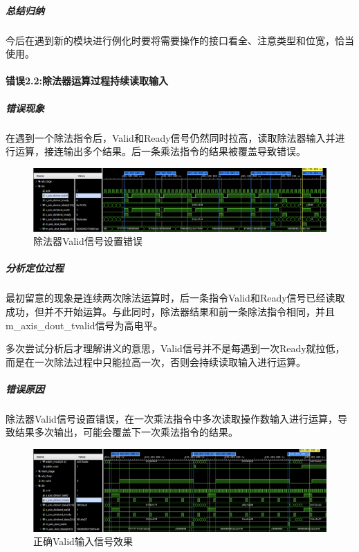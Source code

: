 \documentclass[UTF-8,twoside,c5size]{ctexart}
\begin{document}
	\subparagraph{总结归纳}\hfill
	
	今后在遇到新的模块进行例化时要将需要操作的接口看全、注意类型和位宽，恰当使用。
	
	\paragraph{错误\textbf{2.2:}除法器运算过程持续读取输入}\hfill
	
	\subparagraph{错误现象}\hfill
	
	在遇到一个除法指令后，Valid和Ready信号仍然同时拉高，读取除法器输入并进行运算，接连输出多个结果。后一条乘法指令的结果被覆盖导致错误。
	
	\begin{figure}[h]
		\centering
		\includegraphics[width=1\linewidth]{valid_error.png}
		\caption[valid\_errpr]{除法器Valid信号设置错误}
		\label{fig:validerror}
	\end{figure}
	
	
	\subparagraph{分析定位过程}\hfill
	
	最初留意的现象是连续两次除法运算时，后一条指令Valid和Ready信号已经读取成功，但并不开始运算。与此同时，除法器结果和前一条除法指令相同，并且m\_axis\_dout\_tvalid信号为高电平。
	
	多次尝试分析后才理解讲义的意思，Valid信号并不是每遇到一次Ready就拉低，而是在一次除法过程中只能拉高一次，否则会持续读取输入进行运算。
	
	\subparagraph{错误原因}\hfill
	
	除法器Valid信号设置错误，在一次乘法指令中多次读取操作数输入进行运算，导致结果多次输出，可能会覆盖下一次乘法指令的结果。
	
	\begin{figure}[h]
		\centering
		\includegraphics[width=1\linewidth]{valid_correct.png}
		\caption[Valid\_correct]{正确Valid输入信号效果}
		\label{fig:validcorrect}
	\end{figure}
\end{document}
